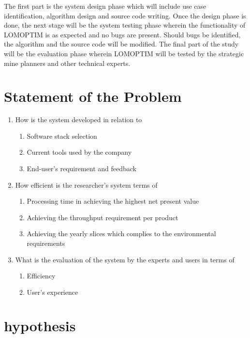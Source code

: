 \documentclass[12pt]{report}
\begin{document}
The first part is the system design phase which will include use case identification, algorithm design and source code writing.
Once the design phase is done, the next stage will be the system testing phase wherein the functionality of LOMOPTIM is as expected and no bugs are present.
Should bugs be identified, the algorithm and the source code will be modified.
The final part of the study will be the evaluation phase wherein LOMOPTIM will be tested by the strategic mine planners and other technical experts.

\section{Statement of the Problem}

\begin{enumerate}
    \item How is the system developed in relation to
            \begin{enumerate}
                \item Software stack selection
                \item Current tools used by the company
                \item End-user's requirement and feedback
            \end{enumerate}
    \item How efficient is the researcher's system terms of
        \begin{enumerate}
            \item Processing time in achieving the highest net present value
            \item Achieving the throughput requirement per product
            \item Achieving the yearly slices which complies to the environmental requirements
        \end{enumerate}
    \item What is the evaluation of the system by the experts and users in terms of
        \begin{enumerate}
            \item Efficiency
            \item User's experience
        \end{enumerate}
\end{enumerate}

\section{hypothesis}
\end{document}
